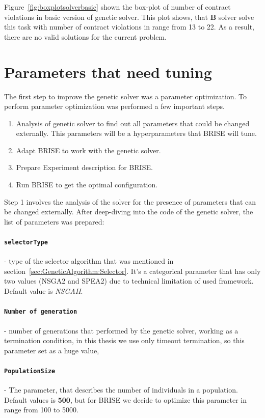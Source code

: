 Figure~\ref{fig:boxplotsolverbasic} shown the box-plot of number of contract violations in basic version of genetic solver. This plot shows, that \textbf{B} solver solve this task with number of contract violations in range from 13 to 22. As a result, there are no valid solutions for the current problem.




\section{Parameters that need tuning}

The first step to improve the genetic solver was a parameter optimization. To perform parameter optimization was performed a few important steps.

\begin{enumerate}
	\item Analysis of genetic solver to find out all parameters that could be changed externally. This parameters will be a hyperparameters that BRISE will tune.
	\item Adapt BRISE to work with the genetic solver.
	\item Prepare Experiment description for BRISE.
	\item Run BRISE to get the optimal configuration.
\end{enumerate}

Step 1 involves the analysis of the solver for the presence of parameters that can be changed externally. After deep-diving into the code of the genetic solver, the list of parameters was prepared:
	\paragraph{\texttt{selectorType}} - type of the selector algorithm that was mentioned in section~\ref{sec:GeneticAlgorithm:Selector}. It's a categorical parameter that has only two values (NSGA2 and SPEA2) due to technical limitation of used framework. Default value is \textit{NSGAII}.
	\paragraph{\texttt{Number of generation}} - number of generations that performed by the genetic solver, working as a termination condition, in this thesis we use only timeout termination, so this parameter set as a huge value,
	\paragraph{\texttt{PopulationSize}} - The parameter, that describes the number of individuals in a population. Default values is \textbf{500}, but for BRISE we decide to optimize this parameter in range from 100 to 5000.\\


